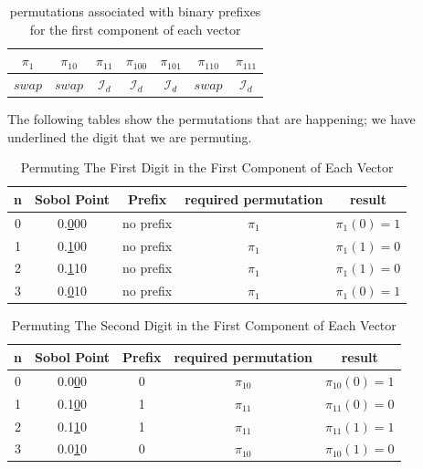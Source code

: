 \documentclass{article}
\theoremstyle{definition}
\begin{document}
\begin{appendices}
\begin{table}[H]
\begin{tabular}{ccccccc}
\hline
$\pi_{1}$ & $\pi_{10}$ & $\pi_{11}$ & $\pi_{100}$ & $\pi_{101}$ & $\pi_{110}$ & $\pi_{111}$ \\
\hline
$\textit{swap}$ 
& $\textit{swap}$ 
& $\mathcal{I}_d$ 
& $\mathcal{I}_d$ 
& $\mathcal{I}_d$ 
& $\textit{swap}$ 
& $\mathcal{I}_d$ \\
\hline
\end{tabular}
\caption{permutations associated with binary prefixes for the first component of each vector}
\end{table}
\noindent The following tables show the permutations that are happening; we have underlined the digit that we are permuting.
\begin{table}[H]       %
  \centering            %
  \caption{Permuting The First Digit in the First Component of Each Vector}
  \label{tab:1}
  \begin{tabular}{|c|c|c|c|c|}  %
    \hline
    n & Sobol Point & Prefix & required permutation & result \\ \hline
    0 & 0.\underline{0}00 & no prefix & $\pi_1$ & $\pi_1(0)=1$ \\ \hline
    1 & 0.\underline{1}00 & no prefix & $\pi_1$ & $\pi_1(1)=0$ \\ \hline
    2 & 0.\underline{1}10 & no prefix & $\pi_1$ & $\pi_1(1)=0$ \\ \hline
    3 & 0.\underline{0}10 & no prefix & $\pi_1$ & $\pi_1(0)=1$ \\ \hline
  \end{tabular}
\end{table}
\begin{table}[H]       %
  \centering            %
  \caption{Permuting The Second Digit in the First Component of Each Vector}
  \label{tab:2}
  \begin{tabular}{|c|c|c|c|c|}  %
    \hline
    n & Sobol Point & Prefix & required permutation & result \\ \hline
    0 & 0.0\underline{0}0 & 0 & $\pi_{10}$ & $\pi_{10}(0)=1$ \\ \hline
    1 & 0.1\underline{0}0 & 1 & $\pi_{11}$ & $\pi_{11}(0)=0$ \\ \hline
    2 & 0.1\underline{1}0 & 1 & $\pi_{11}$ & $\pi_{11}(1)=1$ \\ \hline
    3 & 0.0\underline{1}0 & 0 & $\pi_{10}$ & $\pi_{10}(1)=0$ \\ \hline

\end{tabular}
\end{table}
\end{appendices}
\end{document}
